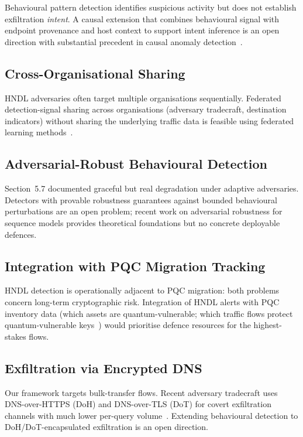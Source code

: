 \documentclass[sigconf,nonacm]{acmart}
\begin{document}
Behavioural pattern detection identifies suspicious activity but
does not establish exfiltration \emph{intent}. A causal extension
that combines behavioural signal with endpoint provenance and host
context to support intent inference is an open direction with
substantial precedent in causal anomaly
detection~\cite{beckers2024causal}.

\subsection{Cross-Organisational Sharing}

HNDL adversaries often target multiple organisations sequentially.
Federated detection-signal sharing across organisations
(adversary tradecraft, destination indicators) without sharing the
underlying traffic data is feasible using federated learning
methods~\cite{kairouz2024fedml}.

\subsection{Adversarial-Robust Behavioural Detection}

Section~5.7 documented graceful but real degradation under adaptive
adversaries. Detectors with provable robustness guarantees against
bounded behavioural perturbations are an open problem; recent work
on adversarial robustness for sequence models provides theoretical
foundations but no concrete deployable defences.

\subsection{Integration with PQC Migration Tracking}

HNDL detection is operationally adjacent to PQC migration: both
problems concern long-term cryptographic risk. Integration of HNDL
alerts with PQC inventory data (which assets are quantum-vulnerable;
which traffic flows protect quantum-vulnerable
keys~\cite{cisa2024pqc}) would prioritise defence resources for
the highest-stakes flows.

\subsection{Exfiltration via Encrypted DNS}

Our framework targets bulk-transfer flows. Recent adversary
tradecraft uses DNS-over-HTTPS (DoH) and DNS-over-TLS (DoT) for
covert exfiltration channels with much lower per-query
volume~\cite{ahmed2024doh}. Extending behavioural detection to
DoH/DoT-encapsulated exfiltration is an open direction.
\end{document}
